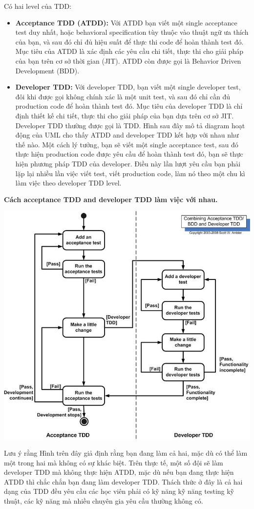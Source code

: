 \documentclass[a4paper]{article}
\begin{document}
Có hai level của TDD:
\begin{itemize}
    \item \textbf{Acceptance TDD (ATDD):} Với ATDD bạn viết một single acceptance test duy nhất, hoặc behavioral specification tùy thuộc vào thuật ngữ ưa thích của bạn, và sau đó chỉ đủ hiệu suất để thực thi code để hoàn thành test đó. Mục tiêu của ATDD là xác định các yêu cầu chi tiết, thực thi cho giải pháp của bạn trên cơ sở thời gian (JIT). ATDD còn được gọi là Behavior Driven Development (BDD).
    \item \textbf{Developer TDD:} Với developer TDD, bạn viết một single developer test, đôi khi được gọi không chính xác là một unit test, và sau đó chỉ cần đủ production code để hoàn thành test đó. Mục tiêu của developer TDD là chỉ định thiết kế chi tiết, thực thi cho giải pháp của bạn dựa trên cơ sở JIT. Developer TDD thường được gọi là TDD. Hình sau đây mô tả diagram hoạt động của UML cho thấy ATDD and developer TDD kết hợp với nhau như thế nào. Một cách lý tưởng, bạn sẽ viết một single acceptance test, sau đó thực hiện production code được yêu cầu để hoàn thành test đó, bạn sẽ thực hiện phương pháp TDD của developer. Điều này lần lượt yêu cầu bạn phải lặp lại nhiều lần việc viết test, viết production code, làm nó theo một chu kì làm việc theo developer TDD level.
\end{itemize}
\textbf{Cách acceptance TDD and developer TDD làm việc với nhau.}
\begin{center}
\includegraphics[scale=0.5]{hinh2.jpg}    
\end{center}
Lưu ý rằng Hình trên đây giả định rằng bạn đang làm cả hai, mặc dù có thể làm một trong hai mà không có sự khác biệt. Trên thực tế, một số đội sẽ làm developer TDD mà không thực hiện ATDD, mặc dù nếu bạn đang thực hiện ATDD thì chắc chắn bạn đang làm developer TDD. Thách thức ở đây là cả hai dạng của TDD đều yêu cầu các học viên phải có kỹ năng kỹ năng testing kỹ thuật, các kỹ năng mà nhiều chuyên gia yêu cầu thường không có.
\end{document}
